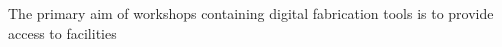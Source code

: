 The primary aim of workshops containing digital fabrication tools is to provide access to facilities 